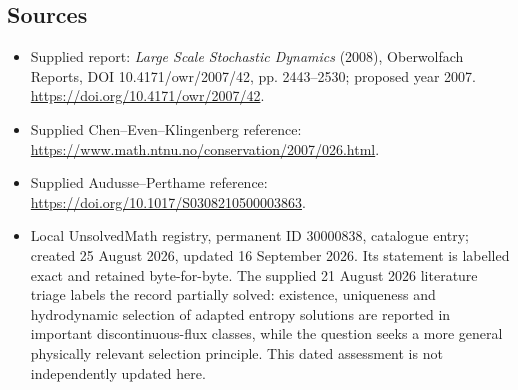 \documentclass[11pt]{article}
\begin{document}
\subsection{Sources}
\begin{itemize}
\item Supplied report: \emph{Large Scale Stochastic Dynamics} (2008), Oberwolfach Reports, DOI 10.4171/owr/2007/42, pp. 2443--2530; proposed year 2007. \url{https://doi.org/10.4171/owr/2007/42}.
\item Supplied Chen--Even--Klingenberg reference: \url{https://www.math.ntnu.no/conservation/2007/026.html}.
\item Supplied Audusse--Perthame reference: \url{https://doi.org/10.1017/S0308210500003863}.
\item Local UnsolvedMath registry, permanent ID 30000838, catalogue entry; created 25 August 2026, updated 16 September 2026. Its statement is labelled exact and retained byte-for-byte. The supplied 21 August 2026 literature triage labels the record partially solved: existence, uniqueness and hydrodynamic selection of adapted entropy solutions are reported in important discontinuous-flux classes, while the question seeks a more general physically relevant selection principle. This dated assessment is not independently updated here.
\end{itemize}
\end{document}

